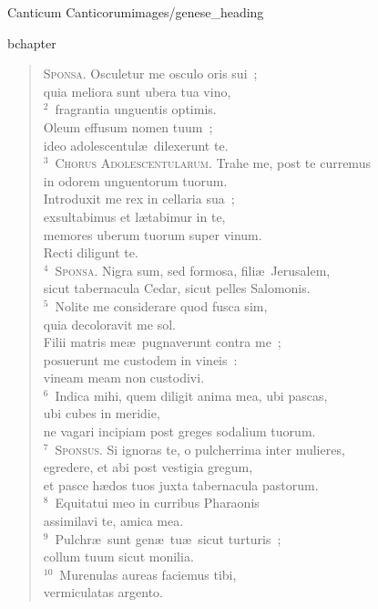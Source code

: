 {Canticum Canticorum}{images/genese_heading}

bchapter\begin{verse}\vspace{-11pt}\textsc{Sponsa.} Osculetur me osculo oris sui~;\\ quia meliora sunt ubera tua vino,\\
${}^{2}$~fragrantia unguentis optimis.\\ Oleum effusum nomen tuum~;\\ ideo adolescentul\ae\ dilexerunt te.\\
${}^{3}$~\textsc{Chorus Adolescentularum.} Trahe me, post te curremus\\ in odorem unguentorum tuorum.\\ Introduxit me rex in cellaria sua~;\\ exsultabimus et l\ae tabimur in te,\\ memores uberum tuorum super vinum.\\ Recti diligunt te.\\
${}^{4}$~\textsc{Sponsa.} Nigra sum, sed formosa, fili\ae\ Jerusalem,\\ sicut tabernacula Cedar, sicut pelles Salomonis.\\
${}^{5}$~Nolite me considerare quod fusca sim,\\ quia decoloravit me sol.\\ Filii matris me\ae\ pugnaverunt contra me~;\\ posuerunt me custodem in vineis~:\\ vineam meam non custodivi.\\
${}^{6}$~Indica mihi, quem diligit anima mea, ubi pascas,\\ ubi cubes in meridie,\\ ne vagari incipiam post greges sodalium tuorum.\\
${}^{7}$~\textsc{Sponsus.} Si ignoras te, o pulcherrima inter mulieres,\\ egredere, et abi post vestigia gregum,\\ et pasce h\ae dos tuos juxta tabernacula pastorum.\\
${}^{8}$~Equitatui meo in curribus Pharaonis\\ assimilavi te, amica mea.\\
${}^{9}$~Pulchr\ae\ sunt gen\ae\ tu\ae\ sicut turturis~;\\ collum tuum sicut monilia.\\
${}^{10}$~Murenulas aureas faciemus tibi,\\ vermiculatas argento.\\

\end{verse}
